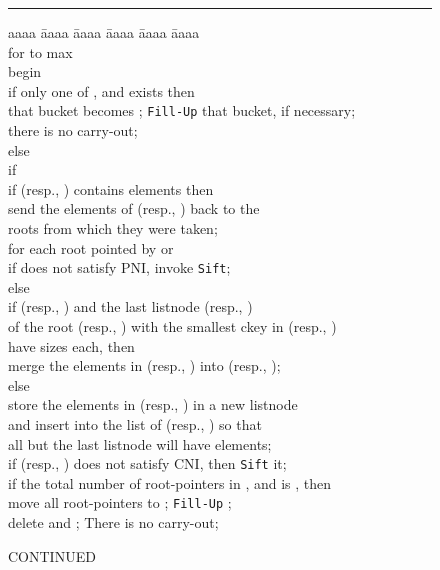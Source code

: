 \begin{figure}
\vspace{0.2in}
\hrule
\begin{tabbing}
aaaa \= aaaa \= aaaa \= aaaa \= aaaa \= aaaa \kill \\
for  to max \\
begin \\
\> if only one of ,  and  exists then \\
\>\>that bucket becomes ; {\tt Fill-Up} that bucket, if necessary; \\
\>\>there is no carry-out; \\
\> else \\
\>\>if  \\
\>\>\>if  (resp., ) contains elements then \\
\>\>\>\> send the elements of  (resp., ) back to the \\
\>\>\>\>roots from which they were taken; \\ 
\>\>\>for each root  pointed by  or  \\ 
\>\>\>\>if  does not satisfy PNI, invoke {\tt Sift}; \\ 
\>\>else \\ 
\>\>\>if  (resp., ) and the last listnode  (resp., ) \\
\>\>\>of the root  (resp., ) with the smallest ckey in  (resp., ) \\
\>\>\>have sizes  each, then \\ 
\>\>\>\>merge the elements in  (resp., ) into  (resp., ); \\ 
\>\>\>else \\ 
\>\>\>\>store the elements in  (resp., ) in a new listnode \\ 
\>\>\>\>and insert  into the list of  (resp., ) so that \\
\>\>\>\>all but the last listnode will have  elements; \\ 
\>\>\>\>if  (resp., ) does not satisfy CNI, then {\tt Sift} it; \\ 
\>if the total number of root-pointers in ,  and  is , then  \\
\>\>move all root-pointers to ; {\tt Fill-Up} ; \\
\>\>delete  and ; There is no carry-out; \\
\end{tabbing}
\hfill {CONTINUED}
\label{fig:meld1}
\end{figure}


